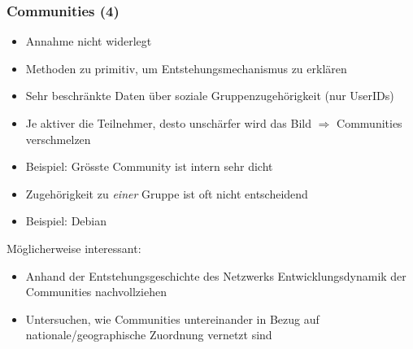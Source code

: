 \documentclass[10pt]{beamer}
\begin{document}
\begin{frame}
  \frametitle{Communities (4)}

  \begin{itemize}
  \item Annahme nicht widerlegt
  \item Methoden zu primitiv, um Entstehungsmechanismus zu erkl\"aren
  \item Sehr beschr\"ankte Daten \"uber soziale Gruppenzugeh\"origkeit
    (nur UserIDs)
  \item Je aktiver die Teilnehmer, desto unsch\"arfer wird das Bild
    $\Rightarrow$ Communities verschmelzen
  \item Beispiel: Gr\"osste Community ist intern sehr dicht
  \item Zugeh\"origkeit zu \emph{einer} Gruppe ist oft nicht
    entscheidend
  \item Beispiel: Debian
  \end{itemize}

  
  M\"oglicherweise interessant:
  \begin{itemize}
  \item Anhand der Entstehungsgeschichte
    des Netzwerks Entwicklungsdynamik der Communities nachvollziehen
  \item Untersuchen, wie Communities untereinander in Bezug auf
    nationale/geographische Zuordnung vernetzt sind
  \end{itemize}
  
\end{frame}
\end{document}
